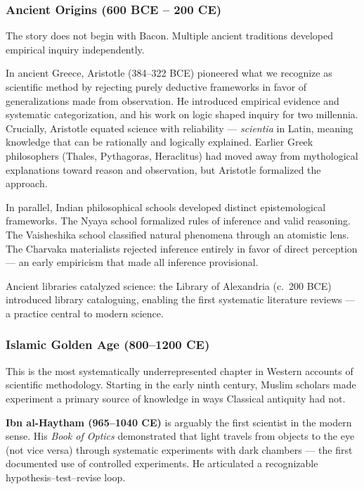 \documentclass[11pt,letterpaper]{article}
\begin{document}
\subsubsection{Ancient Origins (600 BCE -- 200 CE)}

The story does not begin with Bacon. Multiple ancient traditions developed empirical inquiry independently.

In ancient Greece, Aristotle (384--322 BCE) pioneered what we recognize as scientific method by rejecting purely deductive frameworks in favor of generalizations made from observation. He introduced empirical evidence and systematic categorization, and his work on logic shaped inquiry for two millennia. Crucially, Aristotle equated science with reliability --- \emph{scientia} in Latin, meaning knowledge that can be rationally and logically explained. Earlier Greek philosophers (Thales, Pythagoras, Heraclitus) had moved away from mythological explanations toward reason and observation, but Aristotle formalized the approach.

In parallel, Indian philosophical schools developed distinct epistemological frameworks. The Nyaya school formalized rules of inference and valid reasoning. The Vaisheshika school classified natural phenomena through an atomistic lens. The Charvaka materialists rejected inference entirely in favor of direct perception --- an early empiricism that made all inference provisional.

Ancient libraries catalyzed science: the Library of Alexandria (c.\ 200 BCE) introduced library cataloguing, enabling the first systematic literature reviews --- a practice central to modern science.

\subsubsection{Islamic Golden Age (800--1200 CE)}

This is the most systematically underrepresented chapter in Western accounts of scientific methodology. Starting in the early ninth century, Muslim scholars made experiment a primary source of knowledge in ways Classical antiquity had not.

\textbf{Ibn al-Haytham (965--1040 CE)} is arguably the first scientist in the modern sense. His \emph{Book of Optics} demonstrated that light travels from objects to the eye (not vice versa) through systematic experiments with dark chambers --- the first documented use of controlled experiments. He articulated a recognizable hypothesis--test--revise loop.
\end{document}
